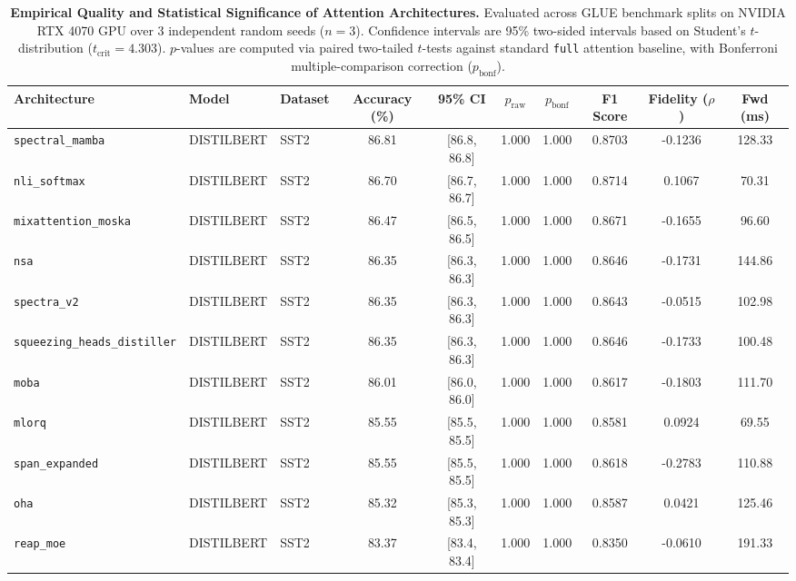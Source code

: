 \begin{table}[t]
\centering
\small
\caption{\textbf{Empirical Quality and Statistical Significance of Attention Architectures.} Evaluated across GLUE benchmark splits on NVIDIA RTX 4070 GPU over 3 independent random seeds ($n=3$). Confidence intervals are 95\% two-sided intervals based on Student's $t$-distribution ($t_{\text{crit}}=4.303$). $p$-values are computed via paired two-tailed $t$-tests against standard \texttt{full} attention baseline, with Bonferroni multiple-comparison correction ($p_{\text{bonf}}$).}
\label{tab:quality_benchmark_results}
\begin{tabular}{l l l c c c c c c c}
\toprule
\textbf{Architecture} & \textbf{Model} & \textbf{Dataset} & \textbf{Accuracy (\%)} & \textbf{95\% CI} & \textbf{$p_{\text{raw}}$} & \textbf{$p_{\text{bonf}}$} & \textbf{F1 Score} & \textbf{Fidelity ($\rho$)} & \textbf{Fwd (ms)} \\
\midrule
\texttt{spectral\_mamba} & DISTILBERT & SST2 & 86.81 & [86.8, 86.8] & 1.000 & 1.000 & 0.8703 & -0.1236 & 128.33 \\
\texttt{nli\_softmax} & DISTILBERT & SST2 & 86.70 & [86.7, 86.7] & 1.000 & 1.000 & 0.8714 & 0.1067 & 70.31 \\
\texttt{mixattention\_moska} & DISTILBERT & SST2 & 86.47 & [86.5, 86.5] & 1.000 & 1.000 & 0.8671 & -0.1655 & 96.60 \\
\texttt{nsa} & DISTILBERT & SST2 & 86.35 & [86.3, 86.3] & 1.000 & 1.000 & 0.8646 & -0.1731 & 144.86 \\
\texttt{spectra\_v2} & DISTILBERT & SST2 & 86.35 & [86.3, 86.3] & 1.000 & 1.000 & 0.8643 & -0.0515 & 102.98 \\
\texttt{squeezing\_heads\_distiller} & DISTILBERT & SST2 & 86.35 & [86.3, 86.3] & 1.000 & 1.000 & 0.8646 & -0.1733 & 100.48 \\
\texttt{moba} & DISTILBERT & SST2 & 86.01 & [86.0, 86.0] & 1.000 & 1.000 & 0.8617 & -0.1803 & 111.70 \\
\texttt{mlorq} & DISTILBERT & SST2 & 85.55 & [85.5, 85.5] & 1.000 & 1.000 & 0.8581 & 0.0924 & 69.55 \\
\texttt{span\_expanded} & DISTILBERT & SST2 & 85.55 & [85.5, 85.5] & 1.000 & 1.000 & 0.8618 & -0.2783 & 110.88 \\
\texttt{oha} & DISTILBERT & SST2 & 85.32 & [85.3, 85.3] & 1.000 & 1.000 & 0.8587 & 0.0421 & 125.46 \\
\texttt{reap\_moe} & DISTILBERT & SST2 & 83.37 & [83.4, 83.4] & 1.000 & 1.000 & 0.8350 & -0.0610 & 191.33 \\

\end{tabular}
\end{table}
